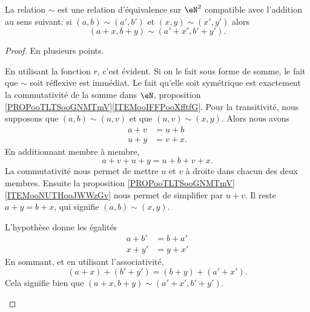 \begin{proposition}     \label{PROPooFIKUooVHlvTt}
	La relation \( \sim\) est une relation d'équivalence sur \( \eN^2\) compatible avec l'addition au sens suivant: si \( (a,b)\sim (a',b')\) et \( (x,y)\sim (x',y')\) alors
    \begin{equation}
	      (a+x,b+y)\sim(a'+x',b'+y').
    \end{equation}
\end{proposition}

\begin{proof}
	En plusieurs points.
	\begin{subproof}
  		En utilisant la fonction \( r \), c'est évident. Si on le fait sous forme de somme, le fait que \( \sim \) soit réflexive est immédiat. Le fait qu'elle soit symétrique est exactement la commutativité de la somme dans \( \eN\), proposition \ref{PROPooTLTSooGNMTmV}\ref{ITEMooIFFPooXfftfG}. Pour la transitivité, nous supposons que \( (a,b)\sim(u,v)\) et que \( (u,v)\sim(x,y)\). Alors nous avons
		\begin{subequations}
			\begin{align}
				a+v & =u+b  \\
				u+y & =v+x.
			\end{align}
		\end{subequations}
		En additionnant membre à membre,
		\begin{equation}
			a+v+u+y=u+b+v+x.
		\end{equation}
		La commutativité nous permet de mettre \( u\) et \( v\) à droite dans chacun des deux membres. Ensuite la proposition \ref{PROPooTLTSooGNMTmV}\ref{ITEMooNUTHooJWWzGv} nous permet de simplifier par \( u+v\). Il reste \( a+y=b+x\), qui signifie \( (a,b)\sim(x,y)\).
  
		L'hypothèse donne les égalités
		\begin{subequations}
			\begin{align}
				a+b' & =b+a' \\
				x+y' & =y+x'
			\end{align}
		\end{subequations}
		En sommant, et en utilisant l'associativité,
		\begin{equation}
			(a+x)+(b'+y')=(b+y)+(a'+x').
		\end{equation}
		Cela signifie bien que \( (a+x,b+y)\sim(a'+x',b'+y')\).
	\end{subproof}
\end{proof}

